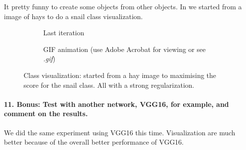 It pretty funny to create some objects from other objects. In  we started from a image of hays to do a snail class visualization.
\begin{figure}[H]
    \centering
    \begin{subfigure}{.5\textwidth}
        \centering
        \caption{Last iteration}
        \label{fig:class_viz_start_image_dif:png}
    \end{subfigure}%
    \begin{subfigure}{.5\textwidth}
        \centering
        \caption{GIF animation (use Adobe Acrobat for viewing or see \textit{.gif})}
        \label{fig:class_viz_start_image_dif:gif}
    \end{subfigure}

    \caption{Class visualization: started from a hay image to maximising the score for the snail class. All with a strong regularization.}
    \label{fig:class_viz_start_image_dif}
\end{figure}

\paragraph*{11. \textbf{Bonus:} Test with another network, VGG16, for example, and comment on the results.}
We did the same experiment using VGG16 this time. Visualization are much better because of the overall better performance of VGG16. %


